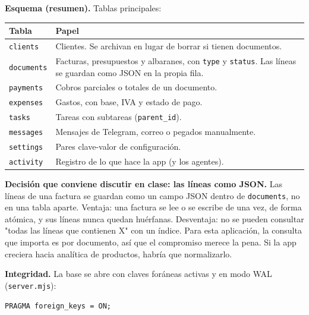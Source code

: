 \textbf{Esquema (resumen).} Tablas principales:

{\def\LTcaptype{none} %
\begin{longtable}[]{@{}
  >{\raggedright\arraybackslash}p{}
  >{\raggedright\arraybackslash}p{}@{}}
\toprule\noalign{}
\begin{minipage}[b]{\linewidth}\raggedright
Tabla
\end{minipage} & \begin{minipage}[b]{\linewidth}\raggedright
Papel
\end{minipage} \\
\midrule\noalign{}
\endhead
\bottomrule\noalign{}
\endlastfoot
\texttt{clients} & Clientes. Se archivan en lugar de borrar si tienen documentos. \\
\texttt{documents} & Facturas, presupuestos y albaranes, con \texttt{type} y \texttt{status}. Las líneas se guardan como JSON en la propia fila. \\
\texttt{payments} & Cobros parciales o totales de un documento. \\
\texttt{expenses} & Gastos, con base, IVA y estado de pago. \\
\texttt{tasks} & Tareas con subtareas (\texttt{parent\_id}). \\
\texttt{messages} & Mensajes de Telegram, correo o pegados manualmente. \\
\texttt{settings} & Pares clave-valor de configuración. \\
\texttt{activity} & Registro de lo que hace la app (y los agentes). \\
\end{longtable}
}

\textbf{Decisión que conviene discutir en clase: las líneas como JSON.} Las líneas de una factura se guardan como un campo JSON dentro de \texttt{documents}, no en una tabla aparte. Ventaja: una factura se lee o se escribe de una vez, de forma atómica, y sus líneas nunca quedan huérfanas. Desventaja: no se pueden consultar "todas las líneas que contienen X" con un índice. Para esta aplicación, la consulta que importa es por documento, así que el compromiso merece la pena. Si la app creciera hacia analítica de productos, habría que normalizarlo.

\textbf{Integridad.} La base se abre con claves foráneas activas y en modo WAL (\texttt{server.mjs}):

\begin{verbatim}
PRAGMA foreign_keys = ON;
\end{verbatim}

